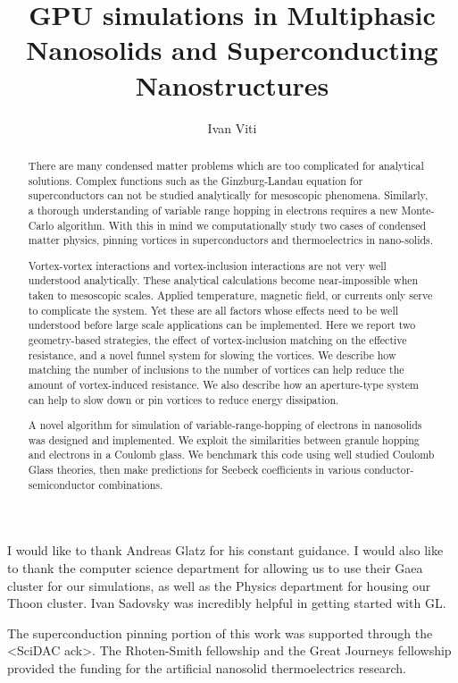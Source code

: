 \documentclass[12pt]{niuthesis}
\begin{document}
\title{GPU simulations in Multiphasic Nanosolids and Superconducting Nanostructures}

\author{Ivan Viti}


\begin{abstract}
There are many condensed matter problems which are too complicated for analytical solutions. Complex functions such as the Ginzburg-Landau equation for superconductors can not be studied analytically for mesoscopic phenomena. Similarly, a thorough understanding of variable range hopping in electrons requires a new Monte-Carlo algorithm. With this in mind we computationally study two cases of condensed matter physics, pinning vortices in superconductors and thermoelectrics in nano-solids.

        Vortex-vortex interactions and vortex-inclusion interactions are not very well understood analytically. These analytical calculations become near-impossible when taken to mesoscopic scales. Applied temperature, magnetic field, or currents only serve to complicate the system. Yet these are all factors whose effects need to be well understood before large scale applications can be implemented. Here we report two geometry-based strategies, the effect of vortex-inclusion matching on the effective resistance, and a novel funnel system for slowing the vortices. We describe how matching the number of inclusions to the number of vortices can help reduce the amount of vortex-induced resistance. We also describe how an aperture-type system can help to slow down or pin vortices to reduce energy dissipation.

	A novel algorithm for simulation of variable-range-hopping of electrons in nanosolids was designed and implemented. We exploit the similarities between granule hopping and electrons in a Coulomb glass. We benchmark this code using well studied Coulomb Glass theories, then make predictions for Seebeck coefficients in various conductor-semiconductor combinations.


\end{abstract}

\begin{acknowledgments}
  I would like to thank Andreas Glatz for his constant guidance. I would also like to thank the computer science department for allowing us to use their Gaea cluster for our simulations, as well as the Physics department for housing our Thoon cluster. Ivan Sadovsky was incredibly helpful in getting started with GL.
  
  The superconduction pinning portion of this work was supported through the <SciDAC ack>. The Rhoten-Smith fellowship and the Great Journeys fellowship provided the funding for the artificial nanosolid thermoelectrics research. 
\end{acknowledgments}
\end{document}

